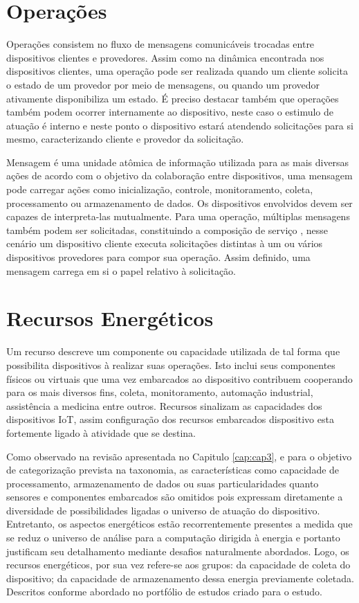 \section{Operações}
Operações consistem no fluxo de mensagens comunicáveis trocadas entre dispositivos clientes e provedores. Assim como na dinâmica encontrada nos dispositivos clientes, uma operação pode ser realizada quando um cliente solicita o estado de um provedor por meio de mensagens, ou quando um provedor ativamente disponibiliza um estado. É preciso destacar também que operações também podem ocorrer internamente ao dispositivo, neste caso o estimulo de atuação é interno e neste ponto o dispositivo estará atendendo solicitações para si mesmo, caracterizando cliente e provedor da solicitação.

Mensagem é uma unidade atômica de informação utilizada para as mais diversas ações de acordo com o objetivo da colaboração entre dispositivos, uma mensagem pode carregar ações como inicialização, controle, monitoramento, coleta, processamento ou armazenamento de dados. Os dispositivos envolvidos devem ser capazes de interpreta-las mutualmente. Para uma operação, múltiplas mensagens também podem ser solicitadas, constituindo a composição de serviço , nesse cenário um dispositivo cliente executa solicitações distintas à um ou vários dispositivos provedores para compor sua operação. Assim definido, uma mensagem carrega em si o papel relativo à solicitação. 



\section{Recursos Energéticos}

Um recurso descreve um componente ou capacidade utilizada de tal forma que possibilita dispositivos à realizar suas operações. Isto inclui seus componentes físicos ou virtuais que uma vez embarcados ao dispositivo contribuem cooperando para os mais diversos fins, coleta, monitoramento, automação industrial, assistência a medicina entre outros. Recursos sinalizam as capacidades dos dispositivos \acs{IoT}, assim configuração dos recursos embarcados dispositivo esta fortemente ligado à atividade que se destina. 

Como observado na revisão apresentada no Capitulo \ref{cap:cap3}, e para o objetivo de categorização prevista na taxonomia, as características como capacidade de processamento, armazenamento de dados ou suas particularidades quanto sensores e componentes embarcados são omitidos pois expressam diretamente a diversidade de possibilidades ligadas o universo de atuação do dispositivo. Entretanto, os aspectos energéticos estão recorrentemente presentes a medida que se reduz o universo de análise para a computação dirigida à energia e portanto justificam seu detalhamento mediante desafios naturalmente abordados. Logo, os recursos energéticos, por sua vez refere-se aos grupos: da capacidade de coleta do dispositivo; da capacidade de armazenamento dessa energia previamente coletada. Descritos conforme abordado no portfólio de estudos criado para o estudo. 

